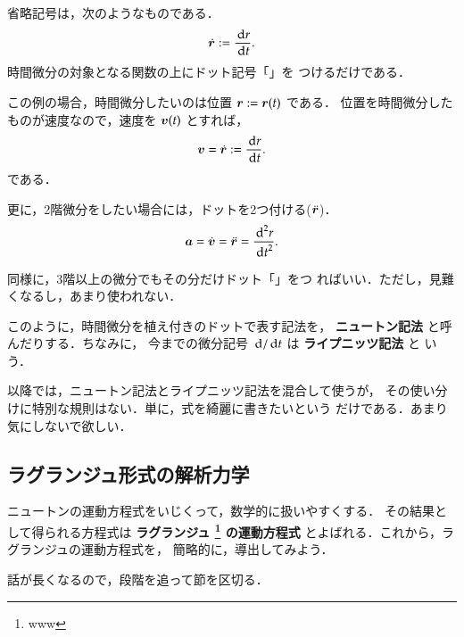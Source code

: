             省略記号は，次のようなものである．
                \begin{align}
                    \dot{\boldsymbol{r}} := \frac{\,\mathrm{d} r}{\,\mathrm{d} t}.
                \end{align}
            時間微分の対象となる関数の上にドット記号「$\dot{\mbox{}}$」を
            つけるだけである．

            この例の場合，時間微分したいのは位置 $\boldsymbol{r} := \boldsymbol{r}(t)$ である．
            位置を時間微分したものが速度なので，速度を $\boldsymbol{v}(t)$ とすれば，
                \begin{equation*}
                    \boldsymbol{v} = \dot{\boldsymbol{r}} := \frac{\,\mathrm{d} r}{\,\mathrm{d} t}.
                \end{equation*}
            である．

            更に，2階微分をしたい場合には，ドットを2つ付ける($\ddot{\boldsymbol{r}}$)．
                \begin{equation*}
                    \boldsymbol{a} = \dot{\boldsymbol{v}} = \ddot{\boldsymbol{r}} = \frac{{\,\mathrm{d}}^{2} r}{{\,\mathrm{d} t}^{2}}.
                \end{equation*}

            同様に，3階以上の微分でもその分だけドット「$\dot{\mbox{}}$」をつ
            ればいい．ただし，見難くなるし，あまり使われない．

            このように，時間微分を植え付きのドットで表す記法を，
            \textbf{ニュートン記法} と呼んだりする．ちなみに，
            今までの微分記号 $\,\mathrm{d}/\,\mathrm{d} t$ は \textbf{ライプニッツ記法} と
            いう．

            以降では，ニュートン記法とライプニッツ記法を混合して使うが，
            その使い分けに特別な規則はない．単に，式を綺麗に書きたいという
            だけである．あまり気にしないで欲しい．

        \subsection{ラグランジュ形式の解析力学}
            \begin{mycomment}
                ニュートンの運動方程式をいじくって，数学的に扱いやすくする．
                その結果として得られる方程式は \textbf{ラグランジュ
                    \footnote{www
                    }
                の運動方程式} とよばれる．これから，ラグランジュの運動方程式を，
                簡略的に，導出してみよう．

                話が長くなるので，段階を追って節を区切る．
            \end{mycomment}

